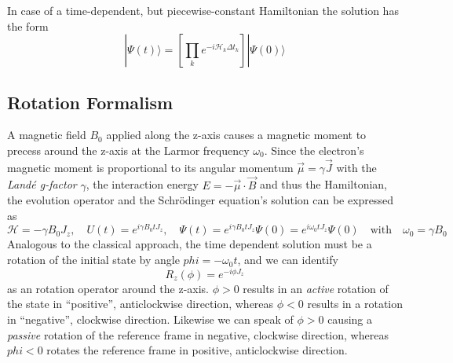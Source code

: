 \documentclass[11.5pt,a4paper]{article}
\begin{document}
In case of a time-dependent, but piecewise-constant Hamiltonian the solution has the form
\begin{equation}
 |\Psi(t)\rangle = \left[ \prod_k e^{-i\mathcal{H}_k \Delta t_k} \right] |\Psi(0)\rangle
\end{equation}

\subsection{Rotation Formalism}
A magnetic field $B_0$ applied along the z-axis causes a magnetic moment to precess around the z-axis at the Larmor frequency $\omega_0$. Since the electron's magnetic moment is proportional to its angular momentum $\vec{\mu} = \gamma \vec{J}$ with the \emph{Land\'e g-factor} $\gamma$, the interaction energy $E = - \vec{\mu} \cdot \vec{B}$ and thus the Hamiltonian, the evolution operator and the Schr\"odinger equation's solution can be expressed as
\begin{equation}
  \mathcal{H} = - \gamma B_0 J_z, \quad U(t) = e^{i \gamma B_0 t J_z}, \quad \Psi(t) = e^{i \gamma B_0 t J_z} \Psi(0) = e^{i \omega_0 t J_z} \Psi(0) \quad \text{with} \quad \omega_0 = \gamma B_0
\end{equation}
Analogous to the classical approach, the time dependent solution must be a rotation of the initial state by angle $phi = -\omega_0 t$, and we can identify 
\begin{equation}
 R_z(\phi) = e^{-i\phi J_z}
\end{equation}
as an rotation operator around the z-axis. $\phi > 0$ results in an \emph{active} rotation of the state in ``positive'', anticlockwise direction, whereas $\phi < 0$ results in  a rotation in ``negative'', clockwise direction. Likewise we can speak of $\phi > 0$ causing a \emph{passive} rotation of the reference frame in negative, clockwise direction, whereas $phi < 0$ rotates the reference frame in positive, anticlockwise direction.
\end{document}
